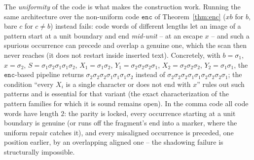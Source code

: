 \documentclass[runningheads,envcountsect]{llncs}
\renewenvironment{remark}
  {\rmfamily\trivlist\item[\hskip\labelsep{\itshape Remark.}]\ignorespaces}
  {\endtrivlist}
\begin{document}
\begin{remark}
    \label{rem:comma}
    The \emph{uniformity} of the code is what makes the construction work. Running the same architecture over the non-uniform code $\mathtt{enc}$ of Theorem~\ref{thm:enc} ($xb$ for $b$, bare $c$ for $c \neq b$) instead fails: code words of different lengths let an image of a pattern start at a unit boundary and end \emph{mid-unit} -- at an escape $x$ -- and such a spurious occurrence can precede and overlap a genuine one, which the scan then never reaches (it does not restart inside inserted text). Concretely, with $b = \sigma_1$, $x = \sigma_2$, $S = \sigma_1\sigma_2\sigma_1\sigma_1\sigma_2$, $X_1 = \sigma_1\sigma_2$, $Y_1 = \sigma_2\sigma_2\sigma_2\sigma_1$, $X_2 = \sigma_2\sigma_2\sigma_2$, $Y_2 = \sigma_1\sigma_1$, the $\mathtt{enc}$-based pipeline returns $\sigma_2\sigma_2\sigma_2\sigma_1\sigma_1\sigma_1\sigma_2$ instead of $\sigma_2\sigma_2\sigma_2\sigma_1\sigma_1\sigma_2\sigma_2\sigma_2\sigma_1$; the condition ``every $X_i$ is a single character or does not end with $x$'' rules out such patterns and is essential for that variant (the exact characterization of the pattern families for which it is sound remains open). In the comma code all code words have length $2$: the parity is locked, every occurrence starting at a unit boundary is genuine (or runs off the fragment's end into a marker, where the uniform repair catches it), and every misaligned occurrence is preceded, one position earlier, by an overlapping aligned one -- the shadowing failure is structurally impossible.
\end{remark}
\end{document}
